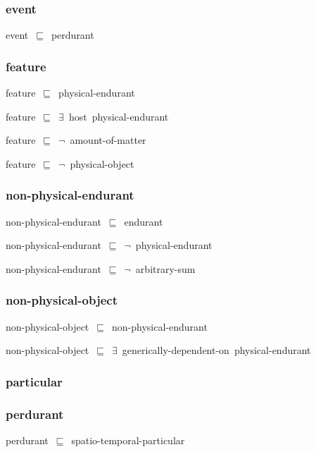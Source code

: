\documentclass{article}
\begin{document}
\subsubsection*{event}

event~\ensuremath{\sqsubseteq}~perdurant~

\subsubsection*{feature}

feature~\ensuremath{\sqsubseteq}~physical-endurant~

feature~\ensuremath{\sqsubseteq}~\ensuremath{\exists}~host~physical-endurant~

feature~\ensuremath{\sqsubseteq}~\ensuremath{\lnot}~amount-of-matter

feature~\ensuremath{\sqsubseteq}~\ensuremath{\lnot}~physical-object

\subsubsection*{non-physical-endurant}

non-physical-endurant~\ensuremath{\sqsubseteq}~endurant~

non-physical-endurant~\ensuremath{\sqsubseteq}~\ensuremath{\lnot}~physical-endurant

non-physical-endurant~\ensuremath{\sqsubseteq}~\ensuremath{\lnot}~arbitrary-sum

\subsubsection*{non-physical-object}

non-physical-object~\ensuremath{\sqsubseteq}~non-physical-endurant~

non-physical-object~\ensuremath{\sqsubseteq}~\ensuremath{\exists}~generically-dependent-on~physical-endurant~

\subsubsection*{particular}

\subsubsection*{perdurant}

perdurant~\ensuremath{\sqsubseteq}~spatio-temporal-particular~
\end{document}
